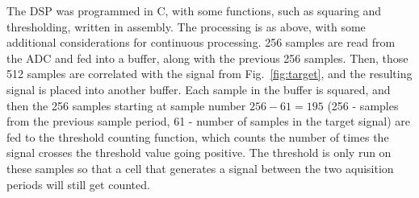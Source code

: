 \documentclass[10pt, journal]{IEEEtran}
\begin{document}
The DSP was programmed in C, with some functions, such as squaring and
thresholding, written in assembly. The processing is as above, with
some additional considerations for continuous processing. 256 samples
are read from the ADC and fed into a buffer, along with the previous
256 samples. Then, those 512 samples are correlated with the signal
from Fig. \,\ref{fig:target}, and the resulting signal is placed into
another buffer. Each sample in the buffer is squared, and then the 256
samples starting at sample number $256-61=195$ (256 - samples from the
previous sample period, 61 - number of samples in the target signal)
are fed to the threshold counting function, which counts the number of
times the signal crosses the threshold value going positive. The
threshold is only run on these samples so that a cell that generates a
signal between the two aquisition periods will still get counted.

\newpage
 {}
\end{document}
